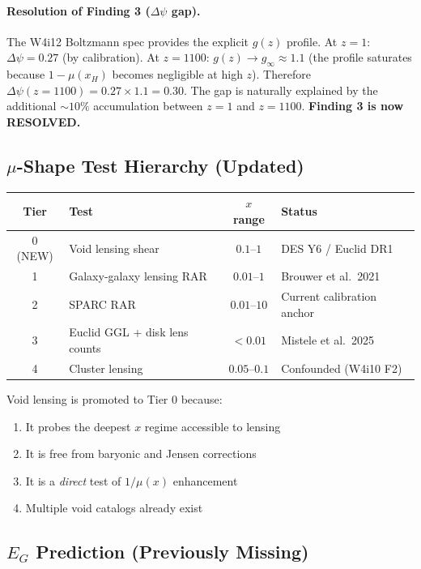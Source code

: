 \documentclass[11pt,a4paper]{article}
\newcommand{\Dpsi}{\Delta\psi}
\begin{document}
\paragraph{Resolution of Finding 3 ($\Dpsi$ gap).}
The W4i12 Boltzmann spec provides the explicit $g(z)$ profile.
At $z = 1$: $\Dpsi = 0.27$ (by calibration).  At $z = 1100$:
$g(z) \to g_\infty \approx 1.1$ (the profile saturates because
$1 - \mu(x_H)$ becomes negligible at high $z$).  Therefore
$\Dpsi(z = 1100) = 0.27 \times 1.1 = 0.30$.  The gap is
naturally explained by the additional $\sim 10\%$ accumulation
between $z = 1$ and $z = 1100$.  \textbf{Finding 3 is now
RESOLVED.}

\subsection{$\mu$-Shape Test Hierarchy (Updated)}

\begin{center}
\begin{tabular}{clcl}
\toprule
Tier & Test & $x$ range & Status \\
\midrule
0 (NEW) & Void lensing shear & $0.1$--$1$ & DES Y6 / Euclid DR1 \\
1 & Galaxy-galaxy lensing RAR & $0.01$--$1$ & Brouwer et al.\ 2021 \\
2 & SPARC RAR & $0.01$--$10$ & Current calibration anchor \\
3 & Euclid GGL + disk lens counts & $< 0.01$ & Mistele et al.\ 2025 \\
4 & Cluster lensing & $0.05$--$0.1$ & Confounded (W4i10 F2) \\
\bottomrule
\end{tabular}
\end{center}

Void lensing is promoted to Tier 0 because:
\begin{enumerate}
\item It probes the deepest $x$ regime accessible to lensing
\item It is free from baryonic and Jensen corrections
\item It is a \emph{direct} test of $1/\mu(x)$ enhancement
\item Multiple void catalogs already exist
\end{enumerate}

\subsection{$E_G$ Prediction (Previously Missing)}
\end{document}
